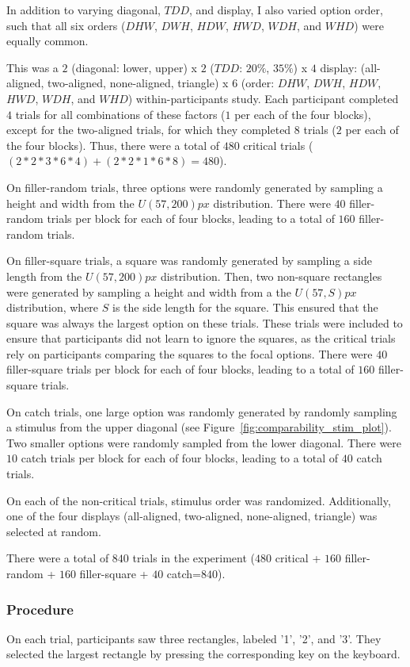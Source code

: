 In addition to varying diagonal, $TDD$, and display, I also varied option order, such that all six orders ($DHW$, $DWH$, $HDW$, $HWD$, $WDH$, and $WHD$) were equally common.

This was a $2$ (diagonal: lower, upper) x $2$ ($TDD$: $20\%$, $35\%$) x $4$ display: (all-aligned, two-aligned, none-aligned, triangle) x $6$ (order: $DHW$, $DWH$, $HDW$, $HWD$, $WDH$, and $WHD$) within-participants study. Each participant completed $4$ trials for all combinations of these factors ($1$ per each of the four blocks), except for the two-aligned trials, for which they completed $8$ trials ($2$ per each of the four blocks). Thus, there were a total of $480$ critical trials ($(2*2*3*6*4)+ (2*2*1*6*8)=480$).

On filler-random trials, three options were randomly generated by sampling a height and width from the $U(57,200)px$ distribution. There were $40$ filler-random trials per block for each of four blocks, leading to a total of $160$ filler-random trials. 

On filler-square trials, a square was randomly generated by sampling a side length from the $U(57,200)px$ distribution. Then, two non-square rectangles were generated by sampling a height and width from a the $U(57,S)px$ distribution, where $S$ is the side length for the square. This ensured that the square was always the largest option on these trials. These trials were included to ensure that participants did not learn to ignore the squares, as the critical trials rely on participants comparing the squares to the focal options. There were $40$ filler-square trials per block for each of four blocks, leading to a total of $160$ filler-square trials.

On catch trials, one large option was randomly generated by randomly sampling a stimulus from the upper diagonal (see Figure~\ref{fig:comparability_stim_plot}). Two smaller options were randomly sampled from the lower diagonal. There were $10$ catch trials per block for each of four blocks, leading to a total of $40$ catch trials.

On each of the non-critical trials, stimulus order was randomized. Additionally, one of the four displays (all-aligned, two-aligned, none-aligned, triangle) was selected at random.

There were a total of $840$ trials in the experiment ($480$ critical + $160$ filler-random + $160$ filler-square + $40$ catch=$840$).

\subsubsection{Procedure}
On each trial, participants saw three rectangles, labeled '1', '2', and '3'. They selected the largest rectangle by pressing the corresponding key on the keyboard. 

